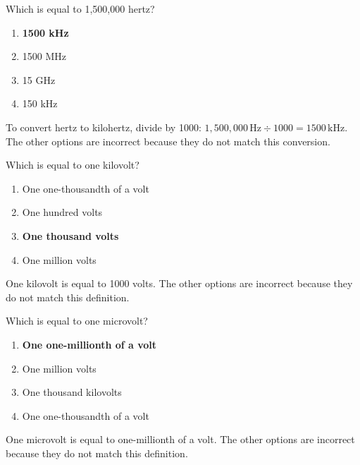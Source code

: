 \begin{tcolorbox}[colback=gray!10!white,colframe=black!75!black,title={T5B02}]
    Which is equal to 1,500,000 hertz?
    \begin{enumerate}[label=\Alph*,noitemsep]
        \item \textbf{1500 kHz}
        \item 1500 MHz
        \item 15 GHz
        \item 150 kHz
    \end{enumerate}
\end{tcolorbox}
To convert hertz to kilohertz, divide by 1000: \(1,500,000 \, \text{Hz} \div 1000 = 1500 \, \text{kHz}\). The other options are incorrect because they do not match this conversion.

\begin{tcolorbox}[colback=gray!10!white,colframe=black!75!black,title={T5B03}]
    Which is equal to one kilovolt?
    \begin{enumerate}[label=\Alph*,noitemsep]
        \item One one-thousandth of a volt
        \item One hundred volts
        \item \textbf{One thousand volts}
        \item One million volts
    \end{enumerate}
\end{tcolorbox}
One kilovolt is equal to 1000 volts. The other options are incorrect because they do not match this definition.

\begin{tcolorbox}[colback=gray!10!white,colframe=black!75!black,title={T5B04}]
    Which is equal to one microvolt?
    \begin{enumerate}[label=\Alph*,noitemsep]
        \item \textbf{One one-millionth of a volt}
        \item One million volts
        \item One thousand kilovolts
        \item One one-thousandth of a volt
    \end{enumerate}
\end{tcolorbox}
One microvolt is equal to one-millionth of a volt. The other options are incorrect because they do not match this definition.

